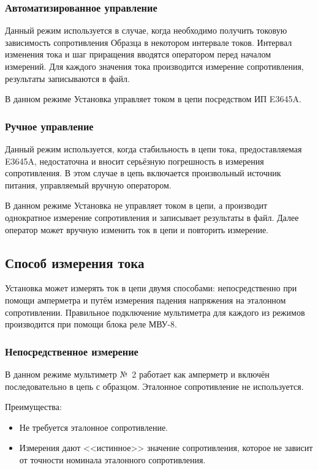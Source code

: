\documentclass[12pt, a4paper, twocolumn]{report}
\begin{document}
\subsubsection{Автоматизированное управление}
\label{sec_auto_current}

Данный режим используется в случае, когда необходимо получить токовую зависимость сопротивления Образца в некотором интервале токов. Интервал изменения тока и шаг приращения вводятся оператором перед началом измерений. Для каждого значения тока производится измерение сопротивления, результаты записываются в файл.

В данном режиме Установка управляет током в цепи посредством ИП E3645A.

\subsubsection{Ручное управление}
\label{sec_manual_current}

Данный режим используется, когда стабильность в цепи тока, предоставляемая E3645A, недостаточна и вносит серьёзную погрешность в измерения сопротивления. В этом случае в цепь включается произвольный источник питания, управляемый вручную оператором.

В данном режиме Установка не управляет током в цепи, а производит однократное измерение сопротивления и записывает результаты в файл. Далее оператор может вручную изменить ток в цепи и повторить измерение.

\subsection{Способ измерения тока}

Установка может измерять ток в цепи двумя способами: непосредственно при помощи амперметра и путём измерения падения напряжения на эталонном сопротивлении. Правильное подключение мультиметра для каждого из режимов производится при помощи блока реле МВУ-8.

\subsubsection{Непосредственное измерение}
\label{sec_direct_measure}

В данном режиме мультиметр №~2 работает как амперметр и включён последовательно в цепь с образцом. Эталонное сопротивление не используется.

Преимущества:

\begin{itemize}
\item Не требуется эталонное сопротивление.
\item Измерения дают <<истинное>> значение сопротивления, которое не зависит от точности номинала эталонного сопротивления.
\end{itemize}
\end{document}
